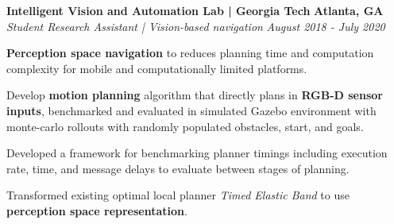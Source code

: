 \headerrow
    {\textbf{Intelligent Vision and Automation Lab | Georgia Tech}}
    {\textbf{Atlanta, GA}}
\\
\headerrow
    {\emph{Student Research Assistant | Vision-based navigation}}
    {\emph{August 2018 - July 2020}}

\begin{itemize*}
    \item \textbf{Perception space navigation} to reduces planning time and computation complexity for mobile and computationally limited platforms. 
    \item Develop \textbf{motion planning} algorithm that directly plans in \textbf{RGB-D sensor inputs},
        benchmarked and evaluated in simulated Gazebo environment with
        monte-carlo rollouts  with randomly populated obstacles, start, and goals.
    \item Developed a framework for benchmarking planner timings including execution rate, time, and message delays to evaluate
        between stages of planning.
    \item Transformed existing optimal local planner \emph{Timed Elastic Band} to use \textbf{perception space representation}.   
\end{itemize*}